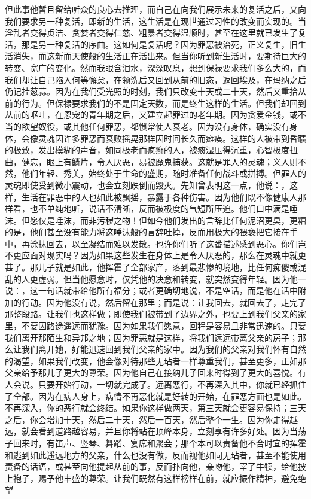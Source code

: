 但此事他暂且留给听众的良心去推理，而自己在向我们展示未来的复活之后，又向我们要求另一种复活，即新的生活，这生活是在现世通过习性的改变而实现的。当淫乱者变得贞洁、贪婪者变得仁慈、粗暴者变得温顺时，甚至在这里就已发生了复活，那是另一种复活的序曲。这如何是复活呢？因为罪恶被治死，正义复生，旧生活消失，而这新而天使般的生活正在活出来。但当你听到新生活时，要期待巨大的转变、宽广的变化。然而我眼含泪水，深深叹息，想到保禄要求我们多么大的，而我们却让自己陷入何等懈怠，在领洗后又回到从前的旧态，返回埃及，在玛纳之后仍记挂葱蒜。因为在我们受光照的时刻，我们只改变十天或二十天，然后又重拾从前的行为。但保禄要求我们的不是固定天数，而是终生这样的生活。但我们却回到从前的呕吐，在恩宠的青年期之后，又建立起罪过的老年期。因为贪爱金钱，或不当的欲望奴役，或其他任何罪恶，都惯常使人衰老。因为没有身体，确实没有身体，会像灵魂因许多罪恶而衰败摇晃那样因时间长久而瘫痪。这样的人被带到昏聩的极致，发出模糊的声音，如同极老而疯癫的人，被痰湿压得沉重，心智极度扭曲，健忘，眼上有鳞片，令人厌恶，易被魔鬼捕获。这就是罪人的灵魂；义人则不然，他们年轻、秀美，始终处于生命的盛期，随时准备任何战斗或拼搏。但罪人的灵魂即使受到微小震动，也会立刻跌倒而毁灭。先知曾表明这一点，他说：，这样，生活在罪恶中的人也如此被飘摇，暴露于各种伤害。因为他们既不像健康人那样看，也不单纯地听，说话不清晰，反而被极度的气短所压迫。他们口中满是唾沫。但愿仅是唾沫，而非污秽之物！但如今他们发出的言辞比任何泥沼更臭，更糟的是，他们甚至没有能力将这唾沫般的言辞吐掉，反而用极大的猥亵把它接在手中，再涂抹回去，以至凝结而难以发散。也许你们听了这番描述感到恶心。你们岂不更应面对现实吗？因为如果这些发生在身体上是令人厌恶的，那么在灵魂中就更甚了。那儿子就是如此，他挥霍了全部家产，落到最悲惨的境地，比任何痴傻或混乱的人更虚弱。但当他愿意时，仅凭他的决意和转变，就突然变得年轻。因为他一说：，这一句话就带给他所有福分；或者更确切地说，不是空话，而是他在话中附加的行动。因为他没有说，然后留在那里；而是说：让我回去，就回去了，走完了那整段路。让我们也这样做；即使我们被带到了边界之外，也要上到我们父亲的家里，不要因路途遥远而犹豫。因为如果我们愿意，回程是容易且非常迅速的。只要我们离开那陌生和异邦之地；因为罪恶就是这样，将我们远远带离父亲的房子；那么让我们离开她，好能迅速回到我们父亲的家中。因为我们的父亲对我们怀有自然的渴望，如果我们改变，他会像对待那些无玷者一样尊重我们，甚至更多，正如那父亲给予那儿子更大的尊荣。因为他自己在接纳儿子回来时得到了更大的喜悦。有人会说。只要开始行动，一切就完成了。远离恶行，不再深入其中，你就已经抓住了全部。因为在病人身上，病情不再恶化就是好转的开始，在罪恶方面也是如此。不再深入，你的恶行就会终结。如果你这样做两天，第三天就会更容易保持；三天之后，你会增加十天，然后二十天，然后一百天，然后整个一生。因为你走得越远，就会看到道路越容易，并且你将站在顶峰本身，立刻享有许多好处。因为当荡子回来时，有笛声、竖琴、舞蹈、宴席和聚会；那个本可以责备他不合时宜的挥霍和逃到如此遥远地方的父亲，什么也没有做，反而视他如同无玷者，甚至不能使用责备的话语，或甚至向他提起从前的事，反而扑向他，亲吻他，宰了牛犊，给他披上袍子，赐予他丰盛的尊荣。让我们既然有这样榜样在前，就应振作精神，避免绝望